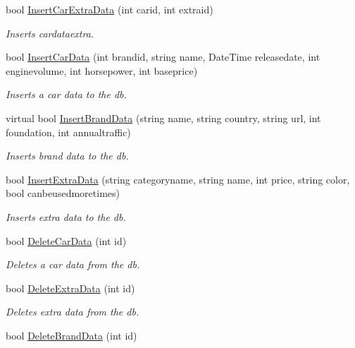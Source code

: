 \begin{DoxyCompactItemize}
bool \mbox{\hyperlink{class_car_shop_1_1_logic_1_1_logic_a6550f647c3e3ea03f12ef30ce5340efe}{Insert\+Car\+Extra\+Data}} (int carid, int extraid)
\begin{DoxyCompactList}\small\item\em Inserts cardataextra. \end{DoxyCompactList}\item 
bool \mbox{\hyperlink{class_car_shop_1_1_logic_1_1_logic_a69bae72bc58ca004bb75e39be1f275c8}{Insert\+Car\+Data}} (int brandid, string name, Date\+Time releasedate, int enginevolume, int horsepower, int baseprice)
\begin{DoxyCompactList}\small\item\em Inserts a car data to the db. \end{DoxyCompactList}\item 
virtual bool \mbox{\hyperlink{class_car_shop_1_1_logic_1_1_logic_abeb648b7fcd87060c3fcbfeef3cda77f}{Insert\+Brand\+Data}} (string name, string country, string url, int foundation, int annualtraffic)
\begin{DoxyCompactList}\small\item\em Inserts brand data to the db. \end{DoxyCompactList}\item 
bool \mbox{\hyperlink{class_car_shop_1_1_logic_1_1_logic_a6534bb6d8a60c3afa39c99dd1fe0747b}{Insert\+Extra\+Data}} (string categoryname, string name, int price, string color, bool canbeusedmoretimes)
\begin{DoxyCompactList}\small\item\em Inserts extra data to the db. \end{DoxyCompactList}\item 
bool \mbox{\hyperlink{class_car_shop_1_1_logic_1_1_logic_ad5164bc7532cb15395d83f6d22b9b816}{Delete\+Car\+Data}} (int id)
\begin{DoxyCompactList}\small\item\em Deletes a car data from the db. \end{DoxyCompactList}\item 
bool \mbox{\hyperlink{class_car_shop_1_1_logic_1_1_logic_ac032e87056e5879f8308bc028577dce3}{Delete\+Extra\+Data}} (int id)
\begin{DoxyCompactList}\small\item\em Deletes extra data from the db. \end{DoxyCompactList}\item 
bool \mbox{\hyperlink{class_car_shop_1_1_logic_1_1_logic_a279fc9fc6ff803ce74bcba0e898ddad4}{Delete\+Brand\+Data}} (int id)

\end{DoxyCompactItemize}
